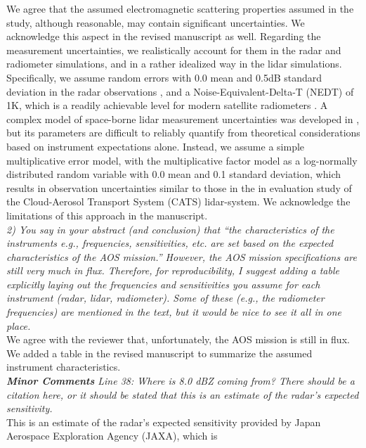 \documentclass[12pt]{article}
\begin{document}
We agree that the assumed electromagnetic scattering properties assumed in the study, although
reasonable, may contain significant uncertainties.  We acknowledge this aspect in the revised manuscript 
as well. Regarding the measurement uncertainties, we realistically account for them in the radar and radiometer simulations,
and in a rather idealized way in the lidar simulations.  Specifically, we assume random errors with 0.0 mean
and 0.5dB standard deviation in the radar observations \cite{takahashi2008}, and a Noise-Equivalent-Delta-T (NEDT)
of 1K, which is a readily achievable level for modern satellite radiometers \cite{draper2015}. A complex 
model of space-borne lidar measurement uncertainties was developed in \cite{liu2006}, but its parameters are
difficult to reliably quantify from theoretical considerations based on instrument expectations alone. Instead, we
assume a simple multiplicative error model, with the multiplicative factor model as a log-normally distributed random
variable with 0.0 mean and 0.1 standard deviation, which results in observation uncertainties similar to those in
the in evaluation study of the Cloud-Aerosol Transport System (CATS) lidar-system. 
We acknowledge the limitations of this approach in the manuscript.\\
\newline
\textit{2) You say in your abstract (and conclusion) that “the characteristics of 
the instruments e.g.,  frequencies, sensitivities, etc. are set based on the 
expected characteristics of the AOS mission.” However, the AOS mission 
specifications are still very much in flux. Therefore, for reproducibility, 
I suggest adding a table explicitly laying out the frequencies and 
sensitivities you assume for each instrument (radar, lidar, radiometer). 
Some of these (e.g., the radiometer frequencies) are mentioned in the text, 
but it would be nice to see it all in one place.}\\
\newline
We agree with the reviewer that, unfortunately, the AOS mission is still in flux. We added a table in the revised
manuscript to summarize the assumed instrument characteristics.\\
\newline
\textit{\textbf{Minor Comments}
Line 38: Where is 8.0 dBZ coming from? There should be a citation here, or it should be stated that this is 
an estimate of the radar’s expected sensitivity.}\\
\newline
This is an estimate of the radar’s expected sensitivity provided by Japan Aerospace Exploration Agency (JAXA), which is
\end{document}
